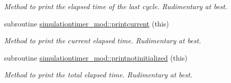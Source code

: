 \begin{DoxyCompactItemize}
\begin{DoxyCompactList}\small\item\em Method to print the elapsed time of the last cycle. Rudimentary at best. \end{DoxyCompactList}\item 
subroutine \mbox{\hyperlink{namespacesimulationtimer__mod_abf4d4c3f383597e975e7c9d12dab6f13}{simulationtimer\+\_\+mod\+::printcurrent}} (this)
\begin{DoxyCompactList}\small\item\em Method to print the current elapsed time. Rudimentary at best. \end{DoxyCompactList}\item 
subroutine \mbox{\hyperlink{namespacesimulationtimer__mod_a1c7581b4e12efde67021c8d94e0ef696}{simulationtimer\+\_\+mod\+::printnotinitialized}} (this)
\begin{DoxyCompactList}\small\item\em Method to print the total elapsed time. Rudimentary at best. \end{DoxyCompactList}\end{DoxyCompactItemize}
